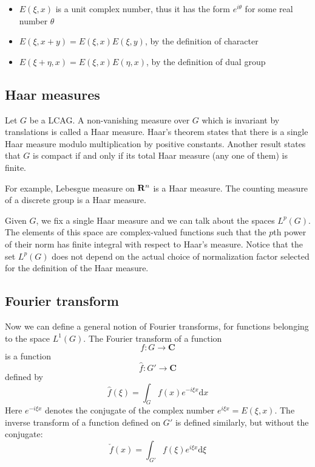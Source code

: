 \begin{itemize}
	\item $E(\xi,x)$ is a unit complex number, thus it has the form
	$e^{i\theta}$ for some real number $\theta$
	\item $E(\xi,x+y) = E(\xi,x)E(\xi,y)$, by the definition of character
	\item $E(\xi + \eta,x) = E(\xi,x)E(\eta,x)$, by the definition of dual
	group
\end{itemize}

\subsection{Haar measures}

Let $G$ be a LCAG.  A non-vanishing measure over $G$ which is invariant by
translations is called a Haar measure.  Haar's theorem states that there is a
single Haar measure modulo multiplication by positive constants.  Another
result states that $G$ is compact if and only if its total Haar measure (any
one of them) is finite.

For example, Lebesgue measure on $\mathbf{R}^n$ is a Haar measure.  The
counting measure of a discrete group is a Haar measure.

Given $G$, we fix a single Haar measure and we can talk about the spaces
$L^p(G)$.  The elements of this space are complex-valued functions such that
the $p$th power of their norm has finite integral with respect to Haar's
measure.  Notice that the set $L^p(G)$ does not depend on the actual choice
of normalization factor selected for the definition of the Haar measure.

\subsection{Fourier transform}

Now we can define a general notion of Fourier transforms, for functions
belonging to the space $L^1(G)$.  The Fourier
transform of a function
\begin{equation}
f:G\to\mathbf{C}
\end{equation}
is a function
\begin{equation}
\hat f:G'\to\mathbf{C}
\end{equation}
defined by
\begin{equation}
\hat f(\xi) = \int_G f(x) e^{-i\xi x}\mathrm{d} x
\end{equation}
Here $e^{-i\xi x}$ denotes the conjugate of the complex number
$e^{i\xi x}=E(\xi,x)$.  The inverse transform of a function defined on $G'$ is defined similarly, but
without the conjugate:
\begin{equation}
\check f(x) = \int_{G'} f(\xi) e^{i\xi x}\mathrm{d} \xi
\end{equation}

